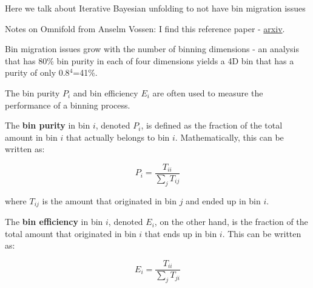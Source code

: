     
    Here we talk about Iterative Bayesian unfolding to not have bin migration issues
    
    Notes on Omnifold from Anselm Vossen:
    I find this reference paper - \href{https://arxiv.org/pdf/1911.09107.pdf}{arxiv}.
    
    
    Bin migration issues grow with the number of binning dimensions - an analysis that has 80\% bin purity in each of four dimensions yields a 4D bin that has a purity of only 0.8$^4$=41\%. 
    
    
    The bin purity $P_{i}$ and bin efficiency $E_{i}$ are often used to measure the performance of a binning process. 
    
    The \textbf{bin purity} in bin $i$, denoted $P_{i}$, is defined as the fraction of the total amount in bin $i$ that actually belongs to bin $i$. Mathematically, this can be written as:
    
    \begin{equation}
    P_{i} = \frac{T_{ii}}{\sum_{j} T_{ij}}
    \end{equation}
    
    where $T_{ij}$ is the amount that originated in bin $j$ and ended up in bin $i$.
    
    The \textbf{bin efficiency} in bin $i$, denoted $E_{i}$, on the other hand, is the fraction of the total amount that originated in bin $i$ that ends up in bin $i$. This can be written as:
    
    \begin{equation}
    E_{i} = \frac{T_{ii}}{\sum_{j} T_{ji}}
    \end{equation}
    
